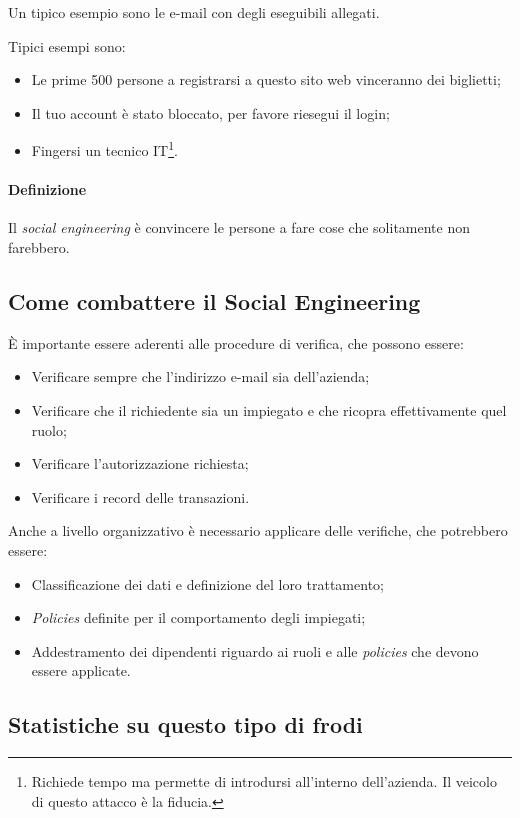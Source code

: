 Un tipico esempio sono le e-mail con degli eseguibili allegati.

Tipici esempi sono:
\begin{itemize}
  \item Le prime 500 persone a registrarsi a questo sito web vinceranno dei
  biglietti;
  \item Il tuo account è stato bloccato, per favore riesegui il login;
  \item Fingersi un tecnico IT\footnote{Richiede tempo ma permette di
introdursi all'interno dell'azienda. Il veicolo di questo attacco è la fiducia.}.
\end{itemize}

\paragraph*{Definizione} Il \textit{social engineering} è convincere le persone
a fare cose che solitamente non farebbero.

\subsection{Come combattere il Social Engineering}

È importante essere aderenti alle procedure di verifica, che possono essere:
\begin{itemize}
  \item Verificare sempre che l'indirizzo e-mail sia dell'azienda;
  \item Verificare che il richiedente sia un impiegato e che ricopra
  effettivamente quel ruolo;
  \item Verificare l'autorizzazione richiesta;
  \item Verificare i record delle transazioni.
\end{itemize}

Anche a livello organizzativo è necessario applicare delle verifiche, che
potrebbero essere:
\begin{itemize}
  \item Classificazione dei dati e definizione del loro trattamento;
  \item \textit{Policies} definite per il comportamento degli impiegati;
  \item Addestramento dei dipendenti riguardo ai ruoli e alle \textit{policies}
che devono essere applicate.
\end{itemize}

\subsection{Statistiche su questo tipo di frodi}

